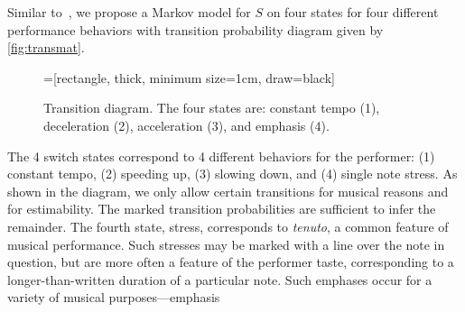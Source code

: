 \documentclass[12pt]{article}
\begin{document}
Similar to~\citet{GuRaphael2012}, we propose a Markov model for $S$ on four
states for four different performance behaviors
with transition probability
diagram given by \autoref{fig:transmat}.
\begin{figure}[tb!]
  \centering
  =[rectangle,
  thick, minimum size=1cm, draw=black]
  \caption{Transition diagram. The four states are: constant tempo
    (1), deceleration (2), acceleration (3), and emphasis (4).\label{fig:transmat}}
\end{figure}
The 4 switch states correspond to 4 different behaviors for the
performer: (1) constant tempo, (2) speeding up, (3) slowing down, and
(4) single note stress. As shown in the diagram, we only allow certain
transitions for musical reasons and for estimability. The marked
transition probabilities are sufficient to infer the remainder. The fourth
state, stress, corresponds to {\em tenuto}, a common feature of
musical performance. Such stresses may be marked with a line over the
note in question, but are more often a feature of the performer taste,
corresponding to a longer-than-written duration of a particular
note. Such emphases occur for a variety of musical purposes---emphasis
\end{document}
